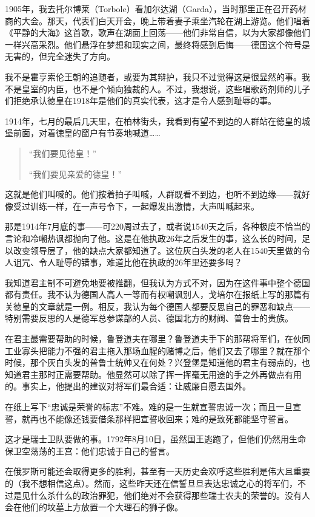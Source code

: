 \documentclass[UTF8]{ctexart}
\begin{document}
1905年，我去托尔博莱（Torbole）看加尔达湖（Garda），当时那里正在召开药材商的大会。那天，代表们白天开会，晚上带着妻子乘坐汽轮在湖上游览。他们唱着《平静的大海》这首歌，歌声在湖面上回荡——他们非常自信，以为大家都像他们一样兴高采烈。他们悬浮在梦想和现实之间，最终将感到后悔——德国这个符号是无害的，但完全迷失了方向。

我不是霍亨索伦王朝的追随者，或要为其辩护，我只不过觉得这是很显然的事。我不是皇室的内臣，也不是个倾向独裁的人。不过，我想说，这些唱歌药剂师的儿子们拒绝承认徳皇在1918年是他们的真实代表，这才是令人感到耻辱的事。

1914年，七月的最后几天里，在柏林街头，我看到有望不到边的人群站在徳皇的城堡前面，对着徳皇的窗户有节奏地喊道……

\begin{verse}
“我们要见徳皇！”

“我们要见亲爱的德皇！”
\end{verse}

这就是他们叫喊的。他们按着拍子叫喊，人群既看不到边，也听不到边缘——就好像受过训练一样，在一声号令下，一起爆发出激情，大声叫喊起来。

那是1914年7月底的事——可220周过去了，或者说1540天之后，各种极度不恰当的言论和冷嘲热讽都抛向了他。这是在他执政26年之后发生的事，这么长的时间，足以改变领导层了，他的缺点大家都知道了。这位灰白头发的老人在1540天里做的令人诅咒、令人耻辱的错事，难道比他在执政的26年里还要多吗？

我知道君主制不可避免地要被推翻，但我认为方式不对，因为在这件事中整个德国都有责任。我不认为德国人高人一等而有权嘲讽别人，戈培尔在报纸上写的那篇有关徳皇的文章就是一例。相反，我认为每个德国人都要反思自己的罪恶和缺点——特别需要反思的人是德军总参谋部的人员、德国北方的财阀、普鲁士的贵族。

在君主最需要帮助的时候，鲁登道夫在哪里？鲁登道夫手下的那帮将军们，在伙同工业寡头把能力不强的君主拖入那场血腥的赌博之后，他们又去了哪里？就在那个时候，那个灰白头发的普鲁士统帅又在何处？兴登堡是知道他的君主有弱点的，也知道君主那时正需要帮助。他显然可以除了挥一挥毫无用途的手之外再做点有用的。事实上，他提出的建议对将军们最合适：让威廉自愿去国外。

在纸上写下“忠诚是荣誉的标志”不难。难的是一生就宣誓忠诚一次；而且一旦宣誓，就再也不能像还钱要借条那样把宣誓收回来；难的是致死都能坚守誓言。

这才是瑞士卫队要做的事。1792年8月10日，虽然国王逃跑了，但他们仍然用生命保卫空荡荡的王宫：他们忠诚于自己的誓言。

在俄罗斯可能还会取得更多的胜利，甚至有一天历史会欢呼这些胜利是伟大且重要的（我不想相信这点）。然而，这些昨天还在信誓旦旦表达忠诚之心的将军们，不过是见什么杀什么的政治罪犯，他们绝对不会获得那些瑞士农夫的荣誉的。没有人会在他们的坟墓上方放置一个大理石的狮子像。
\end{document}

